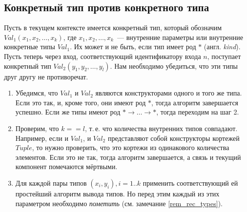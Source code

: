 \label{rem_rec_types}

\subsection{Конкретный тип против конкретного типа}\label{valueVSvalue}
Пусть в текущем контексте имеется конкретный тип, который обозначим $Val_1 (x_1, x_2, \ldots, x_k)$, где $x_1, x_2, \ldots, x_k$~--- внутренние параметры или внутренние конкретные типы $Val_1$. Их может и не быть, если тип имеет род $*$ (англ. \textit{kind}). Пусть теперь через вход, соответствующий идентификатору входа $n$, поступает конкретный тип $Val_2 (y_1, y_2, \ldots, y_l)$. Нам необходимо убедиться, что эти типы друг другу не противоречат.
\begin{enumerate}
	\item Убедимся, что $Val_1$ и $Val_2$ являются конструкторами одного и того же типа. Если это так, и, кроме того, они имеют род $*$, тогда алгоритм завершается успешно. Если же типы имеют род $* \rightarrow \ldots \rightarrow *$, тогда переходим на шаг 2.
	\item Проверим, что $k == l$, т.\,е. что количества внутренних типов совпадают. Например, если и $Val_1$, и $Val_2$ представляют собой конструкторы кортежей $Tuple$, то нужно проверить, что это кортежи из одинакового количества элементов. Если это не так, тогда алгоритм завершается, а связь и текущий компонент помечаются мёртвыми.
	\item Для каждой пары типов $(x_i, y_i), i = 1 .. k$ применить соответствующий ей простейший алгоритм вывода типов.	Но перед этим каждый из этих параметром необходимо \textit{пометить} (см. замечание \ref{rem_rec_types}).
\end{enumerate}

